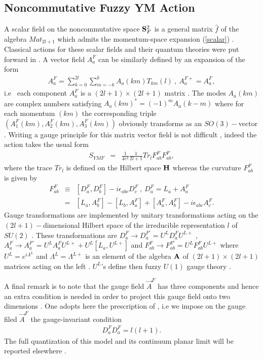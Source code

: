 \documentclass[a4paper,10pt]{article}
\begin{document}
\subsection{Noncommutative Fuzzy YM Action}
A scalar field on the noncommutative space ${\bf S}^2_F$ is a
general matrix $\hat{f}$ of the algebra $Mat_{2l+1}$ which admits
the momentum-space expansion (\ref{scalar}) . Classical actions
for these scalar fields and their quantum theories were put
forward in \cite{ydri2} . A vector field $A_a^F$ can be similarly
defined by an expansion of the form
\begin{eqnarray}
{A}_a^F=\sum_{k=0}^{2l}\sum_{m=-k}^{k}A_a(km)T_{km}(l)~,~A_a^{F+}=A_a^F,
\label{vector}
\end{eqnarray}
i.e ~each component $A_a^F$ is a $(2l+1){\times}(2l+1)$ matrix .
The modes $A_a(km)$ are complex numbers satisfying
$A_a(km)^{*}=(-1)^mA_a(k-m)$
 where for each momentum $(km)$ the corresponding triple
$(A_1^F(km),A_2^F(km),A_3^F(km))$ obviously transforms as an
$SO(3)-$vector . Writing a gauge principle for this matrix vector
field is not difficult , indeed the action takes the usual form
\begin{eqnarray}
S_{YMF}&=&\frac{1}{4e^2}\frac{1}{2l+1}Tr_{l}F_{ab}^FF_{ab}^F,\label{action2}
\end{eqnarray}
where the trace $Tr_l$ is defined on the Hilbert space ${\bf H}$
 whereas the curvature $F_{ab}^F$ is given by
\begin{eqnarray}
F_{ab}^F&{\equiv}&[D_a^F,D_b^F]-i{\epsilon}_{abc}D_c^F~,~D_a^F=L_a+A_a^F\nonumber\\
&=&[L_a,A_b^F]-[L_b,A_a^F]+[A_a^F,A_b^F]-i{\epsilon}_{abc}A_c^F.
\end{eqnarray}
Gauge transformations are implemented by unitary transformations
acting on the $(2l+1)-$dimensional Hilbert space of the
irreducible representation $l$ of $SU(2)$ . These transformations
are $D_a^F{\longrightarrow}D_a^{F'}=U^LD_a^FU^{L+}$ ,
$A_a^F{\longrightarrow}A_a^{F'}=U^LA_a^FU^{L+}+U^L[L_a,U^{L+}]$
and $ F_{ab}^F{\longrightarrow}F_{ab}^{F'}=U^LF_{ab}^FU^{L+}$
where $U^L=e^{i{\Lambda}^L}$ and ${\Lambda}^L={\Lambda}^{L+}$ is
an element of the algebra ${\bf A}$ of $(2l+1){\times}(2l+1)$
matrices acting on the left . $U^L$'s define then fuzzy $U(1)$
gauge theory .

A final remark is to note that the gauge field $\vec{A}^F$ has
three components and hence an extra condition is needed in order
to project this gauge field onto two dimensions . One adopts here
the prescription of \cite{nair} , i.e we impose on the gauge
filed $\vec{A}^F$ the gauge-invariant condition
\begin{eqnarray}
D_a^FD_a^F=l(l+1).\label{local}
\end{eqnarray}
The full quantization of this model and its continuum planar
limit will be reported elsewhere \cite{badis} .
\end{document}
